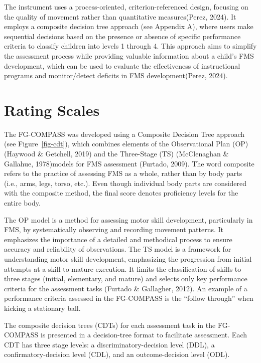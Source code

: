 \documentclass[
  letterpaper,
  DIV=11,
  numbers=noendperiod]{scrreprt}
\begin{document}
The instrument uses a process-oriented, criterion-referenced design,
focusing on the quality of movement rather than quantitative
measures(Perez, 2024). It employs a composite decision tree approach
(see Appendix A), where users make sequential decisions based on the
presence or absence of specific performance criteria to classify
children into levels 1 through 4. This approach aims to simplify the
assessment process while providing valuable information about a child's
FMS development, which can be used to evaluate the effectiveness of
instructional programs and monitor/detect deficits in FMS
development(Perez, 2024).

\section{Rating Scales}\label{rating-scales}

The FG-COMPASS was developed using a Composite Decision Tree approach
(see Figure~\ref{fig-cdt}), which combines elements of the Observational
Plan (OP)(Haywood \& Getchell, 2019) and the Three-Stage (TS)
(McClenaghan \& Gallahue, 1978)models for FMS assessment (Furtado,
2009). The word composite refers to the practice of assessing FMS as a
whole, rather than by body parts (i.e., arms, legs, torso, etc.). Even
though individual body parts are considered with the composite method,
the final score denotes proficiency levels for the entire body.

The OP model is a method for assessing motor skill development,
particularly in FMS, by systematically observing and recording movement
patterns. It emphasizes the importance of a detailed and methodical
process to ensure accuracy and reliability of observations. The TS model
is a framework for understanding motor skill development, emphasizing
the progression from initial attempts at a skill to mature execution. It
limits the classification of skills to three stages (initial,
elementary, and mature) and selects only key performance criteria for
the assessment tasks (Furtado \& Gallagher, 2012). An example of a
performance criteria assessed in the FG-COMPASS is the ``follow
through'' when kicking a stationary ball.

The composite decision trees (CDTs) for each assessment task in the
FG-COMPASS is presented in a decision-tree format to facilitate
assessment. Each CDT has three stage levels: a discriminatory-decision
level (DDL), a confirmatory-decision level (CDL), and an
outcome-decision level (ODL).
\end{document}
